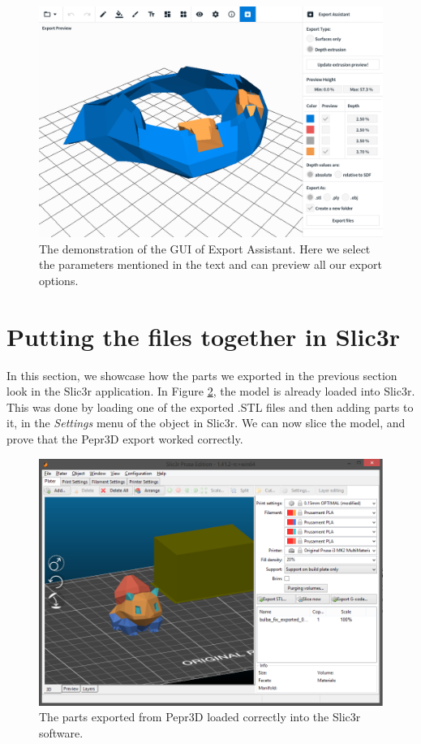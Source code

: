 \begin{figure}
	\centering
	\includegraphics[scale=0.5]{images/export_ui.png}
	\caption{The demonstration of the GUI of Export Assistant. Here we select the parameters mentioned in the text and can preview all our export options.}
	\label{fig:exportui}
\end{figure}

\section{Putting the files together in Slic3r}

In this section, we showcase how the parts we exported in the previous section look in the Slic3r application. In Figure \ref{fig:slicer}, the model is already loaded into Slic3r. This was done by loading one of the exported .STL files and then adding parts to it, in the \textit{Settings} menu of the object in Slic3r. We can now slice the model, and prove that the Pepr3D export worked correctly.

\begin{figure}
	\centering
	\includegraphics[scale=0.5]{images/slicer.png}
	\caption{The parts exported from Pepr3D loaded correctly into the Slic3r software.}
	\label{fig:slicer}
\end{figure}

